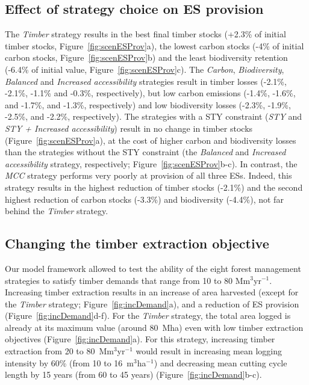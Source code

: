 \documentclass[12pt]{article}
\begin{document}
\subsection*{Effect of strategy choice on ES provision}

The \textit{Timber} strategy results in the best final timber stocks (+2.3\% of initial timber stocks, Figure~\ref{fig:scenESProv}a), the lowest carbon stocks (-4\% of initial carbon stocks, Figure~\ref{fig:scenESProv}b) and the least biodiversity retention (-6.4\% of initial value, Figure~\ref{fig:scenESProv}c). The \textit{Carbon}, \textit{Biodiversity}, \textit{Balanced} and \textit{Increased accessibility} strategies result in timber losses (-2.1\%, -2.1\%, -1.1\% and -0.3\%, respectively), but low carbon emissions (-1.4\%, -1.6\%, and -1.7\%, and -1.3\%, respectively) and low biodiversity losses (-2.3\%, -1.9\%, -2.5\%, and -2.2\%, respectively). The strategies with a STY constraint (\textit{STY} and \textit{STY + Increased accessibility}) result in no change in timber stocks (Figure~\ref{fig:scenESProv}a), at the cost of higher carbon and biodiversity losses than the strategies without the STY constraint (the \textit{Balanced} and \textit{Increased accessibility} strategy, respectively; Figure~\ref{fig:scenESProv}b-c). In contrast, the \textit{MCC} strategy performs very poorly at provision of all three ESs. Indeed, this strategy results in the highest reduction of timber stocks (-2.1\%) and the second highest reduction of carbon stocks (-3.3\%) and biodiversity (-4.4\%), not far behind the \textit{Timber} strategy. 

\subsection*{Changing the timber extraction objective}

Our model framework allowed to test the ability of the eight forest management strategies to satisfy timber demands that range from 10 to 80 Mm$^3$yr$^{-1}$. Increasing timber extraction results in an increase of area harvested (except for the \textit{Timber} strategy; Figure~\ref{fig:incDemand}a), and a reduction of ES provision (Figure~\ref{fig:incDemand}d-f). For the \textit{Timber} strategy, the total area logged is already at its maximum value (around 80~Mha) even with low timber extraction objectives (Figure~\ref{fig:incDemand}a). For this strategy, increasing timber extraction from 20 to 80~Mm$^3$yr$^{-1}$ would result in increasing mean logging intensity by 60\% (from 10 to 16~m$^3$ha$^{-1}$) and decreasing mean cutting cycle length by 15 years (from 60 to 45 years) (Figure~\ref{fig:incDemand}b-c).
\end{document}
